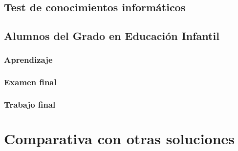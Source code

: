 
\subsection{Test de conocimientos informáticos}

\subsection{Alumnos del Grado en Educación Infantil}

\subsubsection{Aprendizaje}
\subsubsection{Examen final}
\subsubsection{Trabajo final}

\section{Comparativa con otras soluciones}